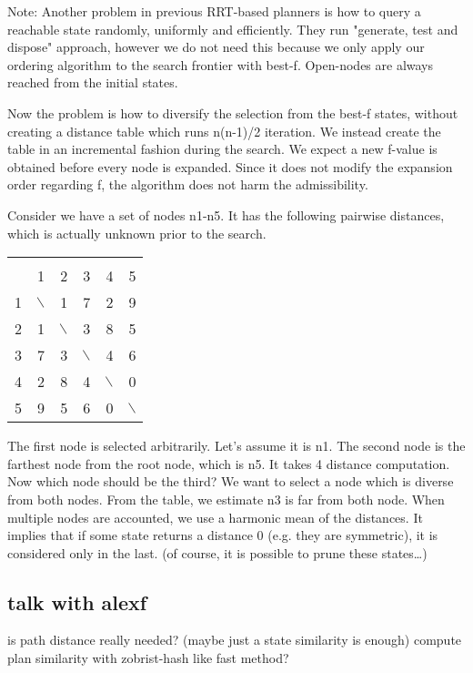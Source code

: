 Note: Another problem in previous RRT-based planners is how to query a reachable
state randomly, uniformly and efficiently. They run "generate, test and
dispose" approach, however we do not need this because we only apply our
ordering algorithm to the search frontier with best-f. Open-nodes are
always reached from the initial states.

Now the problem is how to diversify the selection from the best-f states,
without creating a distance table which runs n(n-1)/2 iteration.
We instead create the table in an incremental fashion during the search.
We expect a new f-value is obtained before every node is expanded.
Since it does not modify the expansion order regarding f, the algorithm
does not harm the admissibility.

Consider we have a set of nodes n1-n5. It has the following
pairwise distances, which is actually unknown prior to the search.

\begin{center}
\begin{tabular}{r|rrrrr|}
 &  &  &  &  & \\
 & 1 & 2 & 3 & 4 & 5\\
\hline
1 & $\backslash$ & 1 & 7 & 2 & 9\\
2 & 1 & $\backslash$ & 3 & 8 & 5\\
3 & 7 & 3 & $\backslash$ & 4 & 6\\
4 & 2 & 8 & 4 & $\backslash$ & 0\\
5 & 9 & 5 & 6 & 0 & $\backslash$\\
\hline
\end{tabular}
\end{center}

The first node is selected arbitrarily. Let's assume it is n1.
The second node is the farthest node from the root node, which is n5. It
takes 4 distance computation.
Now which node should be the third?
We want to select a node which is diverse from both nodes.
From the table, we estimate n3 is far from both node.
When multiple nodes are accounted, we use a harmonic mean of the distances.
It implies that if some state returns a distance 0 (e.g. they are
symmetric), it is considered only in the last. (of course, it is possible to
prune these states\ldots{})
\subsection{talk with alexf}
\label{sec-2-2}

is path distance really needed? (maybe just a state similarity is enough)
compute plan similarity with zobrist-hash like fast method?
